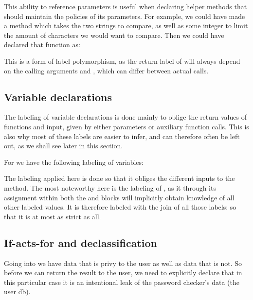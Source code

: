 This ability to reference parameters is useful when declaring helper methods that should maintain the policies of its parameters.
For example, we could have made a  method which takes the two strings to compare, as well as some integer to limit the amount of characters we would want to compare.
Then we could have declared that function as: \\
\begin{minipage}{\linewidth}
  \centering
\end{minipage}

This is a form of label polymorphism, as the return label of  will always depend on the calling arguments  and , which can differ between actual calls.

\subsection{Variable declarations}
The labeling of variable declarations is done mainly to oblige the return values of functions and input, given by either parameters or auxiliary function calls.
This is also why most of these labels are easier to infer, and can therefore often be left out, as we shall see later in this section.

For  we have the following labeling of variables:\\
\begin{minipage}{\linewidth}

\end{minipage}

The labeling applied here is done so that it obliges the different inputs to the method.
The most noteworthy here is the labeling of , as it through its assignment within both the  and  blocks will implicitly obtain knowledge of all other labeled values.
It is therefore labeled with the join of all those labels:  so that it is at most as strict as all.

\subsection{If-acts-for and declassification}\label{ctif:informal:ifactsfor_declassify}
Going into  we have data that is privy to the user as well as data that is not.
So before we can return the result to the user, we need to explicitly declare that in this particular case it is an intentional leak of the password checker's data (the user db).

